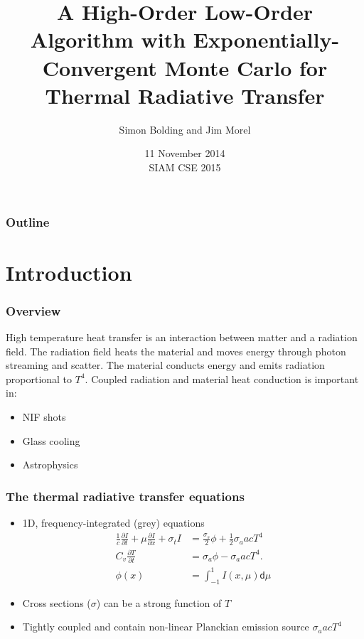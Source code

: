 \documentclass[xcolor=dvipsnames,handout,unknownkeysallowed]{beamer}
\title{A High-Order Low-Order Algorithm with Exponentially-Convergent Monte Carlo for
    Thermal Radiative Transfer}
\author{{\large Simon Bolding and Jim Morel}}
\date{11 November 2014 \\ \vspace{0.05in} {SIAM CSE 2015}}
\newlength{\wideitemsep}
\let\olditem\item
\renewcommand{\item}{\setlength{\itemsep}{\wideitemsep}\olditem}
\newcommand{\pderiv}[2]{\frac{\partial #1}{\partial #2}}
\renewcommand{\d}{\mathsf{d}}
\begin{document}
\begin{frame}
    \titlepage \vspace{-0.213in}
    \begin{center}
    \end{center}    
\end{frame}

\setlength{\tabcolsep}{6pt}

\begin{frame}
\frametitle{Outline}
\begin{minipage}{0.061\linewidth}
\hfill                      
\end{minipage}
\begin{minipage}{0.8\linewidth}
\tableofcontents[
hideothersubsections,
sectionstyle=show,
subsectionstyle=hide
]
\end{minipage}

\end{frame}


\section{Introduction}

\begin{frame}
\frametitle{Overview}
High temperature heat transfer is an interaction between matter and a radiation field. The radiation field heats the material and moves energy through photon streaming and scatter. The material conducts energy and emits radiation proportional to $T^4$.
Coupled radiation and material heat conduction is important in:
\begin{itemize}
\item NIF shots
\item Glass cooling 
\item Astrophysics
\end{itemize}
\end{frame}


\begin{frame}
\frametitle{The thermal radiative transfer equations}
\begin{itemize}
\item 1D, frequency-integrated (grey) equations
\begin{align}\label{ho_cont}
    \frac{1}{c}\pderiv{I}{t} + \mu \pderiv{I}{x} + \sigma_t I
&= \frac{\sigma_s}{2} \phi +\frac{1}{2} \sigma_a a c T^4
  \\
  C_v \pderiv{T}{t} &=  \sigma_a \phi - \sigma_a a c T^4. \\
   \phi(x) &= \int_{-1}^1 I(x,\mu) \d \mu
\end{align}
        \item Cross sections ($\sigma$) can be a strong function of $T$
        \item Tightly coupled and contain non-linear Planckian emission source $\sigma_a a c T^4$
\end{itemize}

\end{frame}
\end{document}
